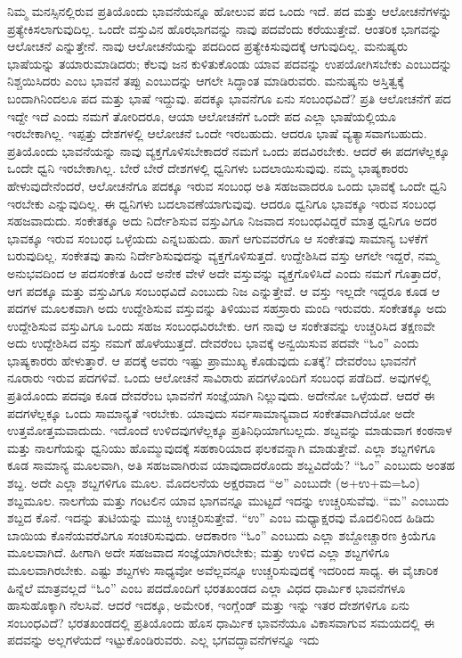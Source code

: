 \vspace{-0.6cm}


\vspace{0.2cm}

ನಿಮ್ಮ ಮನಸ್ಸಿನಲ್ಲಿರುವ ಪ್ರತಿಯೊಂದು ಭಾವನೆಯನ್ನೂ ಹೋಲುವ ಪದ ಒಂದು ಇದೆ. ಪದ ಮತ್ತು ಆಲೋಚನೆಗಳನ್ನು ಪ್ರತ್ಯೇಕಿಸಲಾಗುವುದಿಲ್ಲ. ಒಂದೇ ವಸ್ತುವಿನ ಹೊರಭಾಗವನ್ನು ನಾವು ಪದವೆಂದು ಕರೆಯುತ್ತೇವೆ. ಆಂತರಿಕ ಭಾಗವನ್ನು ಆಲೋಚನೆ ಎನ್ನುತ್ತೇನೆ. ನಾವು ಆಲೋಚನೆಯನ್ನು ಪದದಿಂದ ಪ್ರತ್ಯೇಕಿಸುವುದಕ್ಕೆ ಆಗುವುದಿಲ್ಲ. ಮನುಷ್ಯರು ಭಾಷೆಯನ್ನು ತಯಾರುಮಾಡಿದರು; ಕೆಲವು ಜನ ಕುಳಿತುಕೊಂಡು ಯಾವ ಪದವನ್ನು ಉಪಯೋಗಿಸಬೇಕು ಎಂಬುದನ್ನು ನಿಶ್ಚಯಿಸಿದರು ಎಂಬ ಭಾವನೆ ತಪ್ಪು ಎಂಬುದನ್ನು ಆಗಲೇ ಸಿದ್ಧಾಂತ ಮಾಡಿರುವರು. ಮನುಷ್ಯನು ಅಸ್ತಿತ್ವಕ್ಕೆ ಬಂದಾಗಿನಿಂದಲೂ ಪದ ಮತ್ತು ಭಾಷೆ ಇದ್ದುವು. ಪದಕ್ಕೂ ಭಾವನೆಗೂ ಏನು ಸಂಬಂಧವಿದೆ? ಪ್ರತಿ ಆಲೋಚನೆಗೆ ಪದ ಇದ್ದೇ ಇದೆ ಎಂದು ನಮಗೆ ತೋರಿದರೂ, ಆಯಾ ಆಲೋಚನೆಗೆ ಒಂದೇ ಪದ ಎಲ್ಲಾ ಭಾಷೆಯಲ್ಲಿಯೂ ಇರಬೇಕಾಗಿಲ್ಲ. ಇಪ್ಪತ್ತು ದೇಶಗಳಲ್ಲಿ ಆಲೋಚನೆ ಒಂದೇ ಇರಬಹುದು. ಆದರೂ ಭಾಷೆ ವ್ಯತ್ಯಾಸವಾಗಬಹುದು. ಪ್ರತಿಯೊಂದು ಭಾವನೆಯನ್ನು ನಾವು ವ್ಯಕ್ತಗೊಳಿಸಬೇಕಾದರೆ ನಮಗೆ ಒಂದು ಪದವಿರಬೇಕು. ಆದರೆ ಈ ಪದಗಳೆಲ್ಲಕ್ಕೂ ಒಂದೇ ಧ್ವನಿ ಇರಬೇಕಾಗಿಲ್ಲ. ಬೇರೆ ಬೇರೆ ದೇಶಗಳಲ್ಲಿ ಧ್ವನಿಗಳು ಬದಲಾಯಿಸುವುವು. ನಮ್ಮ ಭಾಷ್ಯಕಾರರು ಹೇಳುವುದೇನೆಂದರೆ, ಆಲೋಚನೆಗೂ ಪದಕ್ಕೂ ಇರುವ ಸಂಬಂಧ ಅತಿ ಸಹಜವಾದರೂ ಒಂದು ಭಾವಕ್ಕೆ ಒಂದೇ ಧ್ವನಿ ಇರಬೇಕು ಎನ್ನುವುದಿಲ್ಲ. ಈ ಧ್ವನಿಗಳು ಬದಲಾವಣೆಯಾಗುವುವು. ಆದರೂ ಧ್ವನಿಗೂ ಭಾವಕ್ಕೂ ಇರುವ ಸಂಬಂಧ ಸಹಜವಾದುದು. ಸಂಕೇತಕ್ಕೂ ಅದು ನಿರ್ದೇಶಿಸುವ ವಸ್ತುವಿಗೂ ನಿಜವಾದ ಸಂಬಂಧವಿದ್ದರೆ ಮಾತ್ರ ಧ್ವನಿಗೂ ಅದರ ಭಾವಕ್ಕೂ ಇರುವ ಸಂಬಂಧ ಒಳ್ಳೆಯದು ಎನ್ನಬಹುದು. ಹಾಗೆ ಆಗುವವರೆಗೂ ಆ ಸಂಕೇತವು ಸಾಮಾನ್ಯ ಬಳಕೆಗೆ ಬರುವುದಿಲ್ಲ. ಸಂಕೇತವು ತಾನು ನಿರ್ದೇಶಿಸುವುದನ್ನು ವ್ಯಕ್ತಗೊಳಿಸುತ್ತದೆ. ಉದ್ದೇಶಿಸಿದ ವಸ್ತು ಆಗಲೇ ಇದ್ದರೆ, ನಮ್ಮ ಅನುಭವದಿಂದ ಆ ಪದಸಂಕೇತ ಹಿಂದೆ ಅನೇಕ ವೇಳೆ ಅದೇ ವಸ್ತುವನ್ನು ವ್ಯಕ್ತಗೊಳಿಸಿದೆ ಎಂದು ನಮಗೆ ಗೊತ್ತಾದರೆ, ಆಗ ಪದಕ್ಕೂ ಮತ್ತು ವಸ್ತುವಿಗೂ ಸಂಬಂಧವಿದೆ ಎಂಬುದು ನಿಜ ಎನ್ನುತ್ತೇವೆ. ಆ ವಸ್ತು ಇಲ್ಲದೇ ಇದ್ದರೂ ಕೂಡ ಆ ಪದಗಳ ಮೂಲಕವಾಗಿ ಅದು ಉದ್ದೇಶಿಸುವ ವಸ್ತುವನ್ನು ತಿಳಿಯುವ ಸಹಸ್ರಾರು ಮಂದಿ ಇರುವರು. ಸಂಕೇತಕ್ಕೂ ಅದು ಉದ್ದೇಶಿಸುವ ವಸ್ತುವಿಗೂ ಒಂದು ಸಹಜ ಸಂಬಂಧವಿರಬೇಕು. ಆಗ ನಾವು ಆ ಸಂಕೇತವನ್ನು ಉಚ್ಚರಿಸಿದ ತಕ್ಷಣವೇ ಅದು ಉದ್ದೇಶಿಸಿದ ವಸ್ತು ನಮಗೆ ಹೊಳೆಯುತ್ತದೆ. ದೇವರೆಂಬ ಭಾವಕ್ಕೆ ಅನ್ವಯಿಸುವ ಪದವೇ “ಓಂ” ಎಂದು ಭಾಷ್ಯಕಾರರು ಹೇಳುತ್ತಾರೆ. ಆ ಪದಕ್ಕೆ ಅವರು ಇಷ್ಟು ಪ್ರಾಮುಖ್ಯ ಕೊಡುವುದು ಏತಕ್ಕೆ? ದೇವರೆಂಬ ಭಾವನೆಗೆ ನೂರಾರು ಇರುವ ಪದಗಳಿವೆ. ಒಂದು ಆಲೋಚನೆ ಸಾವಿರಾರು ಪದಗಳೊಂದಿಗೆ ಸಂಬಂಧ ಪಡೆದಿದೆ. ಅವುಗಳಲ್ಲಿ ಪ್ರತಿಯೊಂದು ಪದವೂ ಕೂಡ ದೇವರೆಂಬ ಭಾವನೆಗೆ ಸಂಜ್ಞೆಯಾಗಿ ನಿಲ್ಲುವುದು. ಅದೇನೋ ಒಳ್ಳೆಯದೆ. ಆದರೆ ಈ ಪದಗಳೆಲ್ಲಕ್ಕೂ ಒಂದು ಸಾಮಾನ್ಯತೆ ಇರಬೇಕು. ಯಾವುದು ಸರ್ವಸಾಮಾನ್ಯವಾದ ಸಂಕೇತವಾಗಿದೆಯೋ ಅದೇ ಉತ್ತಮೋತ್ತಮವಾದುದು. ಇದೊಂದೆ ಉಳಿದವುಗಳೆಲ್ಲಕ್ಕೂ ಪ್ರತಿನಿಧಿಯಾಗಬಲ್ಲದು. ಶಬ್ದವನ್ನು ಮಾಡುವಾಗ ಕಂಠನಾಳ ಮತ್ತು ನಾಲಗೆಯನ್ನು ಧ್ವನಿಯು ಹೊಮ್ಮುವುದಕ್ಕೆ ಸಹಕಾರಿಯಾದ ಫಲಕವನ್ನಾಗಿ ಮಾಡುತ್ತೇವೆ. ಎಲ್ಲಾ ಶಬ್ದಗಳಿಗೂ ಕೂಡ ಸಾಮಾನ್ಯ ಮೂಲವಾಗಿ, ಅತಿ ಸಹಜವಾಗಿರುವ ಯಾವುದಾದರೊಂದು ಶಬ್ದವಿದೆಯೆ? “ಓಂ” ಎಂಬುದು ಅಂತಹ ಶಬ್ದ. ಅದೇ ಎಲ್ಲಾ ಶಬ್ದಗಳಿಗೂ ಮೂಲ. ಮೊದಲನೆಯ ಅಕ್ಷರವಾದ “ಅ” ಎಂಬುದೇ (ಅ+ಉ+ಮ=ಓಂ) ಶಬ್ದಮೂಲ. ನಾಲಗೆಯ ಮತ್ತು ಗಂಟಲಿನ ಯಾವ ಭಾಗವನ್ನೂ ಮುಟ್ಟದೆ ಇದನ್ನು ಉಚ್ಚರಿಸುವೆವು. “ಮ” ಎಂಬುದು ಶಬ್ದದ ಕೊನೆ. ಇದನ್ನು ತುಟಿಯನ್ನು ಮುಚ್ಚಿ ಉಚ್ಚರಿಸುತ್ತೇವೆ. “ಉ” ಎಂಬ ಮಧ್ಯಾಕ್ಷರವು ಮೊದಲಿನಿಂದ ಹಿಡಿದು ಬಾಯಿಯ ಕೊನೆಯವರೆವಿಗೂ ಸಂಚರಿಸುವುದು. ಆದಕಾರಣ “ಓಂ” ಎಂಬುದು ಎಲ್ಲಾ ಶಬ್ದೋಚ್ಚಾರಣ ಕ್ರಿಯೆಗೂ ಮೂಲವಾಗಿದೆ. ಹೀಗಾಗಿ ಅದೇ ಸಹಜವಾದ ಸಂಜ್ಞೆಯಾಗಿರಬೇಕು; ಮತ್ತು ಉಳಿದ ಎಲ್ಲಾ ಶಬ್ದಗಳಿಗೂ ಮೂಲವಾಗಿರಬೇಕು. ಎಷ್ಟು ಶಬ್ದಗಳು ಸಾಧ್ಯವೋ ಅವೆಲ್ಲವನ್ನೂ ಉಚ್ಚರಿಸುವುದಕ್ಕೆ ಇದರಿಂದ ಸಾಧ್ಯ. ಈ ವೈಚಾರಿಕ ಹಿನ್ನೆಲೆ ಮಾತ್ರವಲ್ಲದೆ “ಓಂ” ಎಂಬ ಪದದೊಂದಿಗೆ ಭರತಖಂಡದ ಎಲ್ಲಾ ವಿಧದ ಧಾರ್ಮಿಕ ಭಾವನೆಗಳೂ ಹಾಸುಹೊಕ್ಕಾಗಿ ನೆಲಸಿವೆ. ಆದರೆ ಇದಕ್ಕೂ, ಅಮೇರಿಕ, ಇಂಗ್ಲೆಂಡ್​ ಮತ್ತು ಇನ್ನು ಇತರ ದೇಶಗಳಿಗೂ ಏನು ಸಂಬಂಧವಿದೆ? ಭರತಖಂಡದಲ್ಲಿ ಪ್ರತಿಯೊಂದು ಹೊಸ ಧಾರ್ಮಿಕ ಭಾವನೆಯೂ ವಿಕಾಸವಾಗುವ ಸಮಯದಲ್ಲಿ ಈ ಪದವನ್ನು ಅಲ್ಲಗಳೆಯದೆ ಇಟ್ಟುಕೊಂಡಿರುವರು. ಎಲ್ಲ ಭಗವದ್ಭಾವನೆಗಳನ್ನೂ ಇದು 
